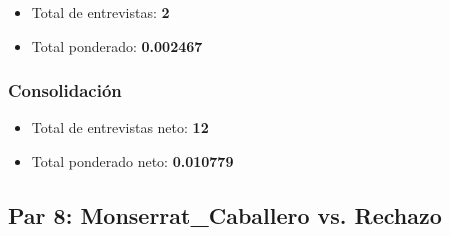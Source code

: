 \documentclass[a4paper,12pt]{article}
\begin{document}
\begin{itemize}
\item Total de entrevistas: \textbf{2}
\item Total ponderado: \textbf{0.002467}
\end{itemize}

\subsubsection*{Consolidación}
\begin{itemize}
\item Total de entrevistas neto: \textbf{12}
\item Total ponderado neto: \textbf{0.010779}
\end{itemize}

\subsection*{Par 8: Monserrat_Caballero vs. Rechazo}
\end{document}
